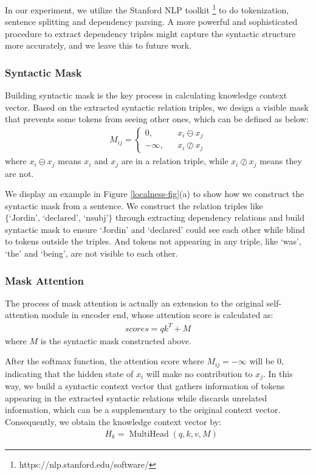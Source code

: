\documentclass[11pt]{article}
\begin{document}
In our experiment, we utilize the Stanford NLP toolkit \footnote{https://nlp.stanford.edu/software/} to do tokenization, sentence splitting and dependency parsing. A more powerful and sophisticated procedure to extract dependency triples might capture the syntactic structure more accurately, and we leave this to future work.


\subsubsection{Syntactic Mask}
Building syntactic mask is the key process in calculating knowledge context vector. Based on the extracted syntactic relation triples, we design a visible mask that prevents some tokens from seeing other ones,  which can be defined as below:
\begin{align}
M_{ij}=\left\{
\begin{aligned}
0, & & x_i \ominus x_j \\
-\infty, & & x_i \oslash x_j
\end{aligned}
\right.
\end{align}
where $x_i \ominus x_j$ means $x_i$ and $x_j$ are in a relation triple, while $x_i \oslash x_j$ means they are not.


We display an example in Figure \ref{localness-fig}(a) to show how we construct the syntactic mask from a sentence. We construct the relation triples like $\{\textrm{`Jordin', `declared', `nsubj'}\}$ through extracting dependency relations and build syntactic mask to ensure `Jordin' and `declared' could see each other 
while blind to tokens outside the triples. And tokens not appearing in any triple, like `was', `the' and `being', are not visible to each other.




\subsubsection{Mask Attention}
The process of mask attention is actually an extension to the original self-attention module in encoder end, whose attention score is calculated as:
\begin{align}
scores = qk^T + M
\end{align}
where $M$ is the syntactic mask constructed above.

After the softmax function, the attention score where $M_{ij} = -\infty$ will be 0, indicating that the hidden state of $x_i$ will make no contribution to $x_j$. In this way, we build a syntactic context vector that gathers information of tokens appearing in the extracted syntactic relations while discards unrelated information, which can be a supplementary to the original context vector. Consequently, we obtain the knowledge context vector by:
\begin{align}
    & H_k = \operatorname{MultiHead}(q, k, v, M)
\end{align}
\end{document}
